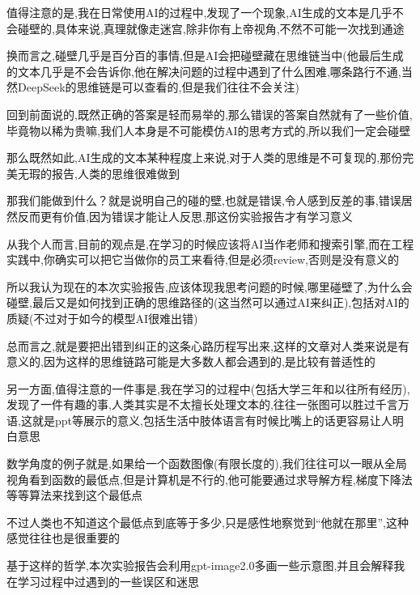 值得注意的是,我在日常使用AI的过程中,发现了一个现象,AI生成的文本是几乎不会碰壁的,具体来说,真理就像走迷宫,除非你有上帝视角,不然不可能一次找到通途

换而言之,碰壁几乎是百分百的事情,但是AI会把碰壁藏在思维链当中(他最后生成的文本几乎是不会告诉你,他在解决问题的过程中遇到了什么困难,哪条路行不通,当然DeepSeek的思维链是可以查看的,但是我们往往不会关注)

回到前面说的,既然正确的答案是轻而易举的,那么错误的答案自然就有了一些价值,毕竟物以稀为贵嘛,我们人本身是不可能模仿AI的思考方式的,所以我们一定会碰壁

那么既然如此,AI生成的文本某种程度上来说,对于人类的思维是不可复现的,那份完美无瑕的报告,人类的思维很难做到

那我们能做到什么？就是说明自己的碰的壁,也就是错误,令人感到反差的事,错误居然反而更有价值,因为错误才能让人反思,那这份实验报告才有学习意义

从我个人而言,目前的观点是,在学习的时候应该将AI当作老师和搜索引擎,而在工程实践中,你确实可以把它当做你的员工来看待,但是必须review,否则是没有意义的

所以我认为现在的本次实验报告,应该体现我思考问题的时候,哪里碰壁了,为什么会碰壁,最后又是如何找到正确的思维路径的(这当然可以通过AI来纠正),包括对AI的质疑(不过对于如今的模型AI很难出错)

总而言之,就是要把出错到纠正的这条心路历程写出来,这样的文章对人类来说是有意义的,因为这样的思维链路可能是大多数人都会遇到的,是比较有普适性的

另一方面,值得注意的一件事是,我在学习的过程中(包括大学三年和以往所有经历),发现了一件有趣的事,人类其实是不太擅长处理文本的,往往一张图可以胜过千言万语,这就是ppt等展示的意义,包括生活中肢体语言有时候比嘴上的话更容易让人明白意思

数学角度的例子就是,如果给一个函数图像(有限长度的),我们往往可以一眼从全局视角看到函数的最低点,但是计算机是不行的,他可能要通过求导解方程,梯度下降法等等算法来找到这个最低点

不过人类也不知道这个最低点到底等于多少,只是感性地察觉到“他就在那里”,这种感觉往往也是很重要的

基于这样的哲学,本次实验报告会利用gpt-image2.0多画一些示意图,并且会解释我在学习过程中过遇到的一些误区和迷思